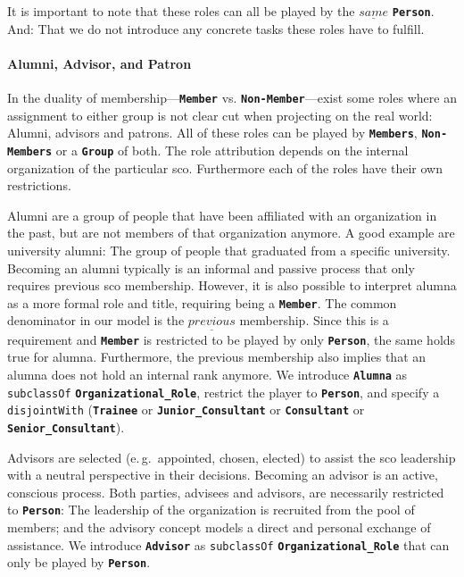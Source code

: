 \documentclass[a4paper, DIV=13, BCOR=0cm]{scrbook}
\newcommand{\eg}{e.\,g.\ }
\newcommand{\class}[1]{\texttt{\textbf{#1}}}
\newcommand{\relation}[1]{\texttt{#1}}
\begin{document}
It is important to note that these roles can all be played by the $\underline{same}$ \class{Person}. And: That we do not introduce any concrete tasks these roles have to fulfill.

\paragraph{Alumni, Advisor, and Patron}
In the duality of membership---\class{Member} vs. \class{Non-Member}---exist some roles where an assignment to either group is not clear cut when projecting on the real world: Alumni, advisors and patrons. All of these roles can be played by \class{Members}, \class{Non-Members} or a \class{Group} of both. The role attribution depends on the internal organization of the particular \gls{sco}. Furthermore each of the roles have their own restrictions.

Alumni are a group of people that have been affiliated with an organization in the past, but are not members of that organization anymore. A good example are university alumni: The group of people that graduated from a specific university. Becoming an alumni typically is an informal and passive process that only requires previous \gls{sco} membership. However, it is also possible to interpret alumna as a more formal role and title, requiring being a \class{Member}. The common denominator in our model is the $\underline{previous}$ membership. Since this is a requirement and \class{Member} is restricted to be played by only \class{Person}, the same holds true for alumna. Furthermore, the previous membership also implies that an alumna does not hold an internal rank anymore. We introduce \class{Alumna} as \relation{subclassOf} \class{Organizational\_Role}, restrict the player to \class{Person}, and specify a \relation{disjointWith} (\class{Trainee} or \class{Junior\_Consultant} or \class{Consultant} or \class{Senior\_Consultant}).

Advisors are selected (\eg appointed, chosen, elected) to assist the \gls{sco} leadership with a neutral perspective in their decisions. Becoming an advisor is an active, conscious process. Both parties, advisees and advisors, are necessarily restricted to \class{Person}: The leadership of the organization is recruited from the pool of members; and the advisory concept models a direct and personal exchange of assistance. We introduce \class{Advisor} as \relation{subclassOf} \class{Organizational\_Role} that can only be played by \class{Person}.
\end{document}
